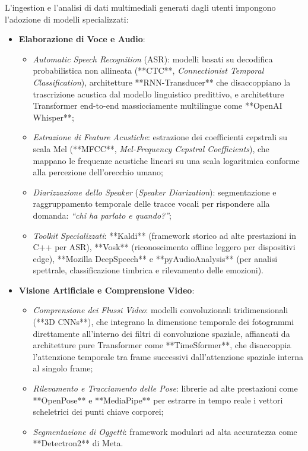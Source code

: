 \documentclass[11pt, a4paper]{article}
\begin{document}
L'ingestion e l'analisi di dati multimediali generati dagli utenti impongono l'adozione di modelli specializzati:
\begin{itemize}
    \item \textbf{Elaborazione di Voce e Audio}:
    \begin{itemize}
        \item \emph{Automatic Speech Recognition} (ASR): modelli basati su decodifica probabilistica non allineata (**CTC**, \emph{Connectionist Temporal Classification}), architetture **RNN-Transducer** che disaccoppiano la trascrizione acustica dal modello linguistico predittivo, e architetture Transformer end-to-end massicciamente multilingue come **OpenAI Whisper**;
        \item \emph{Estrazione di Feature Acustiche}: estrazione dei coefficienti cepstrali su scala Mel (**MFCC**, \emph{Mel-Frequency Cepstral Coefficients}), che mappano le frequenze acustiche lineari su una scala logaritmica conforme alla percezione dell'orecchio umano;
        \item \emph{Diarizzazione dello Speaker} (\emph{Speaker Diarization}): segmentazione e raggruppamento temporale delle tracce vocali per rispondere alla domanda: \emph{``chi ha parlato e quando?''};
        \item \emph{Toolkit Specializzati}: **Kaldi** (framework storico ad alte prestazioni in C++ per ASR), **Vosk** (riconoscimento offline leggero per dispositivi edge), **Mozilla DeepSpeech** e **pyAudioAnalysis** (per analisi spettrale, classificazione timbrica e rilevamento delle emozioni).
    \end{itemize}
    \item \textbf{Visione Artificiale e Comprensione Video}:
    \begin{itemize}
        \item \emph{Comprensione dei Flussi Video}: modelli convoluzionali tridimensionali (**3D CNNs**), che integrano la dimensione temporale dei fotogrammi direttamente all'interno dei filtri di convoluzione spaziale, affiancati da architetture pure Transformer come **TimeSformer**, che disaccoppia l'attenzione temporale tra frame successivi dall'attenzione spaziale interna al singolo frame;
        \item \emph{Rilevamento e Tracciamento delle Pose}: librerie ad alte prestazioni come **OpenPose** e **MediaPipe** per estrarre in tempo reale i vettori scheletrici dei punti chiave corporei;
        \item \emph{Segmentazione di Oggetti}: framework modulari ad alta accuratezza come **Detectron2** di Meta.
    \end{itemize}
\end{itemize}
\end{document}
